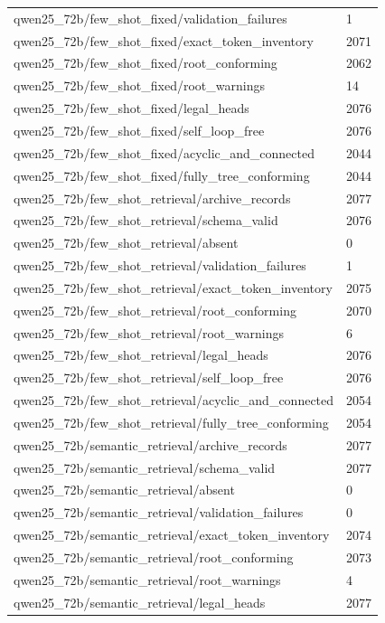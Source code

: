 \begin{tabular}{ll}
qwen25\_72b/few\_shot\_fixed/validation\_failures & 1 \\
qwen25\_72b/few\_shot\_fixed/exact\_token\_inventory & 2071 \\
qwen25\_72b/few\_shot\_fixed/root\_conforming & 2062 \\
qwen25\_72b/few\_shot\_fixed/root\_warnings & 14 \\
qwen25\_72b/few\_shot\_fixed/legal\_heads & 2076 \\
qwen25\_72b/few\_shot\_fixed/self\_loop\_free & 2076 \\
qwen25\_72b/few\_shot\_fixed/acyclic\_and\_connected & 2044 \\
qwen25\_72b/few\_shot\_fixed/fully\_tree\_conforming & 2044 \\
qwen25\_72b/few\_shot\_retrieval/archive\_records & 2077 \\
qwen25\_72b/few\_shot\_retrieval/schema\_valid & 2076 \\
qwen25\_72b/few\_shot\_retrieval/absent & 0 \\
qwen25\_72b/few\_shot\_retrieval/validation\_failures & 1 \\
qwen25\_72b/few\_shot\_retrieval/exact\_token\_inventory & 2075 \\
qwen25\_72b/few\_shot\_retrieval/root\_conforming & 2070 \\
qwen25\_72b/few\_shot\_retrieval/root\_warnings & 6 \\
qwen25\_72b/few\_shot\_retrieval/legal\_heads & 2076 \\
qwen25\_72b/few\_shot\_retrieval/self\_loop\_free & 2076 \\
qwen25\_72b/few\_shot\_retrieval/acyclic\_and\_connected & 2054 \\
qwen25\_72b/few\_shot\_retrieval/fully\_tree\_conforming & 2054 \\
qwen25\_72b/semantic\_retrieval/archive\_records & 2077 \\
qwen25\_72b/semantic\_retrieval/schema\_valid & 2077 \\
qwen25\_72b/semantic\_retrieval/absent & 0 \\
qwen25\_72b/semantic\_retrieval/validation\_failures & 0 \\
qwen25\_72b/semantic\_retrieval/exact\_token\_inventory & 2074 \\
qwen25\_72b/semantic\_retrieval/root\_conforming & 2073 \\
qwen25\_72b/semantic\_retrieval/root\_warnings & 4 \\
qwen25\_72b/semantic\_retrieval/legal\_heads & 2077 \\

\end{tabular}
